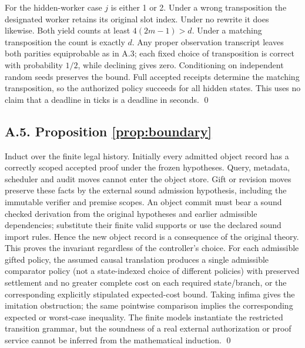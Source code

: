 \documentclass[11pt,letterpaper]{article}
\begin{document}
For the hidden-worker case $j$ is either 1 or 2. Under a wrong transposition the designated worker retains its original slot index. Under no rewrite it does likewise. Both yield counts at least $4(2m-1)>d$. Under a matching transposition the count is exactly $d$. Any proper observation transcript leaves both parities equiprobable as in A.3; each fixed choice of transposition is correct with probability $1/2$, while declining gives zero. Conditioning on independent random seeds preserves the bound. Full accepted receipts determine the matching transposition, so the authorized policy succeeds for all hidden states. This uses no claim that a deadline in ticks is a deadline in seconds. \qed

\subsection*{A.5. Proposition \ref{prop:boundary}}
Induct over the finite legal history. Initially every admitted object record has a correctly scoped accepted proof under the frozen hypotheses. Query, metadata, scheduler and audit moves cannot enter the object store. Gift or revision moves preserve these facts by the external sound admission hypothesis, including the immutable verifier and premise scopes. An object commit must bear a sound checked derivation from the original hypotheses and earlier admissible dependencies; substitute their finite valid supports or use the declared sound import rules. Hence the new object record is a consequence of the original theory. This proves the invariant regardless of the controller's choice. For each admissible gifted policy, the assumed causal translation produces a single admissible comparator policy (not a state-indexed choice of different policies) with preserved settlement and no greater complete cost on each required state/branch, or the corresponding explicitly stipulated expected-cost bound. Taking infima gives the imitation obstruction; the same pointwise comparison implies the corresponding expected or worst-case inequality. The finite models instantiate the restricted transition grammar, but the soundness of a real external authorization or proof service cannot be inferred from the mathematical induction. \qed
\end{document}
